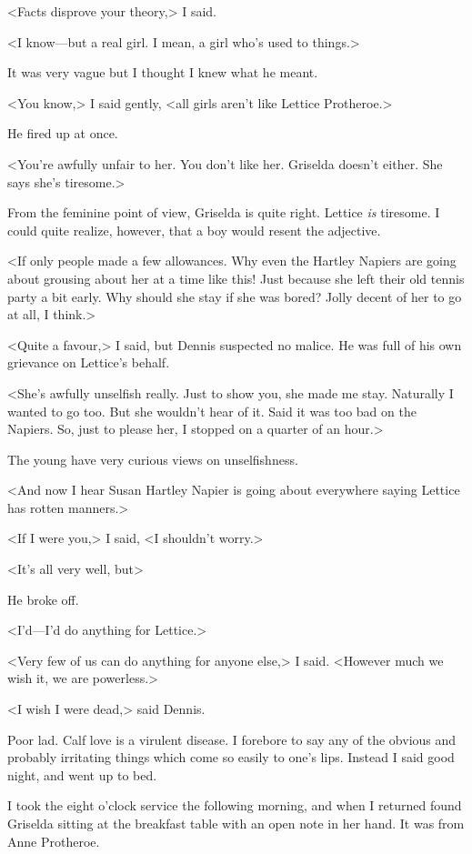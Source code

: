 <Facts disprove your theory,> I said.

<I know—but a real girl. I mean, a girl who's used to things.>

It was very vague but I thought I knew what he meant.

<You know,> I said gently, <all girls aren't like Lettice Protheroe.>

He fired up at once.

<You're awfully unfair to her. You don't like her. Griselda doesn't either. She says she's tiresome.>

From the feminine point of view, Griselda is quite right. Lettice \emph{is} tiresome. I could quite realize, however, that a boy would resent the adjective.

<If only people made a few allowances. Why even the Hartley Napiers are going about grousing about her at a time like this! Just because she left their old tennis party a bit early. Why should she stay if she was bored? Jolly decent of her to go at all, I think.>

<Quite a favour,> I said, but Dennis suspected no malice. He was full of his own grievance on Lettice's behalf.

<She's awfully unselfish really. Just to show you, she made me stay. Naturally I wanted to go too. But she wouldn't hear of it. Said it was too bad on the Napiers. So, just to please her, I stopped on a quarter of an hour.>

The young have very curious views on unselfishness.

<And now I hear Susan Hartley Napier is going about everywhere saying Lettice has rotten manners.>

<If I were you,> I said, <I shouldn't worry.>

<It's all very well, but\longdash>

He broke off.

<I'd—I'd do anything for Lettice.>

<Very few of us can do anything for anyone else,> I said. <However much we wish it, we are powerless.>

<I wish I were dead,> said Dennis.

Poor lad. Calf love is a virulent disease. I forebore to say any of the obvious and probably irritating things which come so easily to one's lips. Instead I said good night, and went up to bed.

I took the eight o'clock service the following morning, and when I returned found Griselda sitting at the breakfast table with an open note in her hand. It was from Anne Protheroe.

